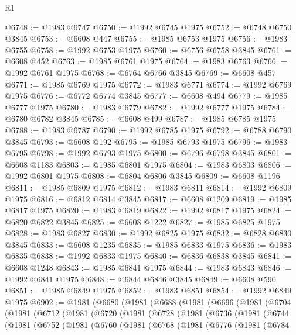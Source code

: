 \begin{lexlean}{R1}
\begin{coremodule}
@6748 := @1983 @6747
@6750 := @1992 @6745 @1975
@6752 := @6748 @6750 @3845
@6753 := @6608 @447
@6755 := @1985 @6753 @1975
@6756 := @1983 @6755
@6758 := @1992 @6753 @1975
@6760 := @6756 @6758 @3845
@6761 := @6608 @452
@6763 := @1985 @6761 @1975
@6764 := @1983 @6763
@6766 := @1992 @6761 @1975
@6768 := @6764 @6766 @3845
@6769 := @6608 @457
@6771 := @1985 @6769 @1975
@6772 := @1983 @6771
@6774 := @1992 @6769 @1975
@6776 := @6772 @6774 @3845
@6777 := @6608 @494
@6779 := @1985 @6777 @1975
@6780 := @1983 @6779
@6782 := @1992 @6777 @1975
@6784 := @6780 @6782 @3845
@6785 := @6608 @499
@6787 := @1985 @6785 @1975
@6788 := @1983 @6787
@6790 := @1992 @6785 @1975
@6792 := @6788 @6790 @3845
@6793 := @6608 @192
@6795 := @1985 @6793 @1975
@6796 := @1983 @6795
@6798 := @1992 @6793 @1975
@6800 := @6796 @6798 @3845
@6801 := @6608 @1183
@6803 := @1985 @6801 @1975
@6804 := @1983 @6803
@6806 := @1992 @6801 @1975
@6808 := @6804 @6806 @3845
@6809 := @6608 @1196
@6811 := @1985 @6809 @1975
@6812 := @1983 @6811
@6814 := @1992 @6809 @1975
@6816 := @6812 @6814 @3845
@6817 := @6608 @1209
@6819 := @1985 @6817 @1975
@6820 := @1983 @6819
@6822 := @1992 @6817 @1975
@6824 := @6820 @6822 @3845
@6825 := @6608 @1222
@6827 := @1985 @6825 @1975
@6828 := @1983 @6827
@6830 := @1992 @6825 @1975
@6832 := @6828 @6830 @3845
@6833 := @6608 @1235
@6835 := @1985 @6833 @1975
@6836 := @1983 @6835
@6838 := @1992 @6833 @1975
@6840 := @6836 @6838 @3845
@6841 := @6608 @1248
@6843 := @1985 @6841 @1975
@6844 := @1983 @6843
@6846 := @1992 @6841 @1975
@6848 := @6844 @6846 @3845
@6849 := @6608 @590
@6851 := @1985 @6849 @1975
@6852 := @1983 @6851
@6854 := @1992 @6849 @1975
@6902 := @1981
    (@6680
      (@1981
        (@6688
          (@1981
            (@6696
              (@1981
                (@6704
                  (@1981
                    (@6712
                      (@1981
                        (@6720
                          (@1981
                            (@6728
                              (@1981
                                (@6736
                                  (@1981
                                    (@6744
                                      (@1981
                                        (@6752
                                          (@1981
                                            (@6760
                                              (@1981
                                                (@6768
                                                  (@1981
                                                    (@6776
                                                      (@1981
                                                        (@6784

\end{coremodule}
\end{lexlean}
